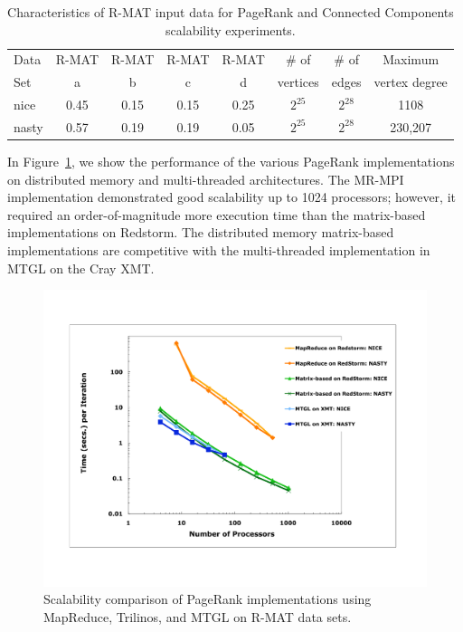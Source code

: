 \begin{table}
\begin{tabular}{|l|c|c|c|c|c|c|c|}
\hline
Data & R-MAT  & R-MAT  & R-MAT  & R-MAT  & \# of    & \# of & Maximum \\
Set  & a      & b      & c      & d      & vertices & edges & vertex degree\\
\hline
nice  & 0.45 & 0.15 & 0.15 & 0.25 & $2^{25}$ & $2^{28}$ & 1108 \\
nasty & 0.57 & 0.19 & 0.19 & 0.05 & $2^{25}$ & $2^{28}$ & 230,207\\
\hline
\end{tabular}
\caption{Characteristics of R-MAT input data for PageRank and Connected
Components scalability experiments.}
\label{t:rmat}
\end{table}

In Figure~\ref{f:prbig}, we show the performance 
of the various PageRank
implementations on distributed memory and multi-threaded architectures.
The MR-MPI implementation demonstrated good scalability up to 1024 processors; 
however, it required an order-of-magnitude
more execution time than the matrix-based implementations on Redstorm.  
The distributed memory matrix-based
implementations are competitive with the multi-threaded implementation
in MTGL on the Cray XMT.

\begin{figure}[h!]
\includegraphics[width=\textwidth]{fig_pagerank_big.pdf}
\caption{Scalability comparison of PageRank implementations using MapReduce,
Trilinos, and MTGL on R-MAT data sets.}
\label{f:prbig}
\end{figure}


